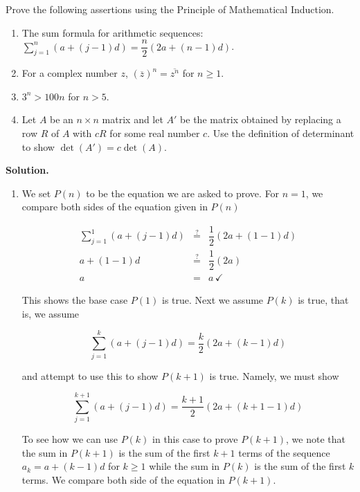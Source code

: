 \begin{ex}  Prove the following assertions using the Principle of Mathematical Induction.

\begin{enumerate}

\item  The sum formula for arithmetic sequences: $\displaystyle{\sum_{j=1}^{n} (a + (j-1)d) = \dfrac{n}{2}(2a + (n-1)d)}$.

\item  For a complex number $z$, $\left(\overline{z}\right)^n = \overline{z^{n}}$ for $n \geq 1$.

\item  $3^{n} > 100n$ for $n > 5$.

\item  Let $A$ be an $n \times n$ matrix and let $A'$ be the matrix obtained by replacing a row $R$ of $A$ with $cR$ for some real number $c$.  Use the definition of determinant to show $\det(A') = c \det(A)$.


\end{enumerate}

{\bf Solution.}

\begin{enumerate}

\item We set $P(n)$ to be the equation we are asked to prove.  For $n=1$, we compare both sides of the equation given in $P(n)$

\[ \begin{array}{rcl} 

\displaystyle{\sum_{j=1}^{1} (a + (j-1)d)} & \stackrel{\text{?}}{=} & \dfrac{1}{2}(2a + (1-1)d) \\ [15pt]
                              a + (1-1) d & \stackrel{\text{?}}{=} & \dfrac{1}{2} (2a) \\ [10pt]
                                         a & = & a \, \checkmark \end{array} \]

This shows the base case $P(1)$ is true.  Next we assume $P(k)$ is true, that is, we assume

\[ \displaystyle{\sum_{j=1}^{k} (a + (j-1)d)  = \dfrac{k}{2}(2a + (k-1)d)}\]

and attempt to use this to show $P(k+1)$ is true.  Namely, we must show

\[ \displaystyle{\sum_{j=1}^{k+1} (a + (j-1)d)  =  \dfrac{k+1}{2}(2a + (k+1-1)d)}\]

To see how we can use $P(k)$ in this case to prove $P(k+1)$, we note that the sum in $P(k+1)$ is the sum of the first $k+1$ terms of the sequence $a_{k} = a + (k-1)d$ for $k \geq 1$ while the sum in $P(k)$ is the sum of the first $k$ terms. We compare both side of the equation in $P(k+1)$.


\end{enumerate}
\end{ex}
